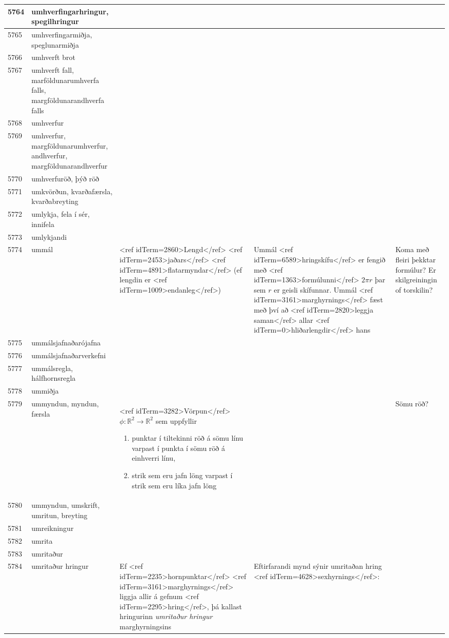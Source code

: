 \begin{longtable}{p{}|p{}|p{}|p{}|p{}}
\hline
5764 & umhverfingarhringur, spegilhringur &  &  &  \\
\hline
5765 & umhverfingarmiðja, speglunarmiðja &  &  &  \\
\hline
5766 & umhverft brot &  &  &  \\
\hline
5767 & umhverft fall, marföldunarumhverfa falls, margföldunarandhverfa falls &  &  &  \\
\hline
5768 & umhverfur &  &  &  \\
\hline
5769 & umhverfur, margföldunarumhverfur, andhverfur, margföldunarandhverfur &  &  &  \\
\hline
5770 & umhverfuröð, þýð röð &  &  &  \\
\hline
5771 & umkvörðun, kvarðafærsla, kvarðabreyting &  &  &  \\
\hline
5772 & umlykja, fela í sér, innifela &  &  &  \\
\hline
5773 & umlykjandi &  &  &  \\
\hline
5774 & ummál & <ref idTerm=2860>Lengd</ref> <ref idTerm=2453>jaðars</ref> <ref idTerm=4891>flatarmyndar</ref> (ef lengdin er <ref idTerm=1009>endanleg</ref>) & Ummál <ref idTerm=6589>hringskífu</ref> er fengið með <ref idTerm=1363>formúlunni</ref> $2\pi r$ þar sem $r$ er geisli skífunnar. Ummál <ref idTerm=3161>marghyrnings</ref> fæst með því að <ref idTerm=2820>leggja saman</ref> allar <ref idTerm=0>hliðarlengdir</ref> hans & Koma með fleiri þekktar formúlur? Er skilgreiningin of torskilin? \\
\hline
5775 & ummálsjafnaðarójafna &  &  &  \\
\hline
5776 & ummálsjafnaðarverkefni &  &  &  \\
\hline
5777 & ummálsregla, hálfhornsregla &  &  &  \\
\hline
5778 & ummiðja &  &  &  \\
\hline
5779 & ummyndun, myndun, færsla & <ref idTerm=3282>Vörpun</ref> $\phi : \mathbb{R}^2 \to \mathbb{R}^2$ sem uppfyllir

\begin{enumerate}
    \item punktar í tiltekinni röð á sömu línu varpast í punkta í sömu röð á einhverri línu,
    \item strik sem eru jafn löng varpast í strik sem eru líka jafn löng
\end{enumerate} &  & Sömu röð? \\
\hline
5780 & ummyndun, umskrift, umritun, breyting &  &  &  \\
\hline
5781 & umreikningur &  &  &  \\
\hline
5782 & umrita &  &  &  \\
\hline
5783 & umritaður &  &  &  \\
\hline
5784 & umritaður hringur & Ef <ref idTerm=2235>hornpunktar</ref> <ref idTerm=3161>marghyrnings</ref> liggja allir á gefnum <ref idTerm=2295>hring</ref>, þá kallast hringurinn \textit{umritaður hringur} marghyrningsins & Eftirfarandi mynd sýnir umritaðan hring <ref idTerm=4628>sexhyrnings</ref>:


\end{longtable}
